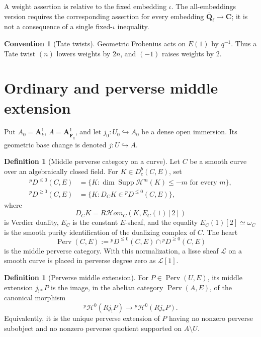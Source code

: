\documentclass[10pt]{article}
\theoremstyle{definition}
\newtheorem{definition}[theorem]{Definition}
\newtheorem{convention}[theorem]{Convention}
\newcommand{\Fbar}{\overline{\mathbf F}_q}
\newcommand{\Qlb}{\overline{\mathbf Q}_\ell}
\newcommand{\Aone}{\mathbf A^1}
\begin{document}
A weight assertion is relative to the fixed embedding \(\iota\).  The
all-embeddings version requires the corresponding assertion
for every embedding \(\Qlb\to\mathbf C\); it is not a consequence of
a single fixed-\(\iota\) inequality.

\begin{convention}[Tate twists]
Geometric Frobenius acts on \(E(1)\) by \(q^{-1}\).  Thus a Tate twist
\((n)\) lowers weights by \(2n\), and \((-1)\) raises weights by \(2\).
\end{convention}

\section{Ordinary and perverse middle extension}

Put \(A_0=\Aone_k\), \(A=\Aone_{\Fbar}\), and let
\(j_0:U_0\hookrightarrow A_0\) be a dense open immersion.  Its geometric
base change is denoted \(j:U\hookrightarrow A\).

\begin{definition}[Middle perverse category on a curve]
Let \(C\) be a smooth curve over an algebraically closed field.  For
\(K\in D^b_c(C,E)\), set
\[
 \begin{aligned}
 {}^pD^{\le0}(C,E)
   &=\{K:\dim\operatorname{Supp}\mathcal H^m(K)\le -m
          \text{ for every }m\},\\
 {}^pD^{\ge0}(C,E)
   &=\{K:D_CK\in{}^pD^{\le0}(C,E)\},
 \end{aligned}
\]
where
\[
 D_CK=R\mathcal Hom_C(K,E_C(1)[2])
\]
is Verdier duality, \(E_C\) is the constant \(E\)-sheaf, and the equality
\(E_C(1)[2]\simeq\omega_C\) is the smooth purity identification of the
dualizing complex of \(C\).  The heart
\[
  \operatorname{Perv}(C,E)
  :={}^pD^{\le0}(C,E)\cap{}^pD^{\ge0}(C,E)
\]
is the middle perverse category.  With this normalization, a lisse sheaf
\(\mathcal L\) on a smooth curve is placed in perverse degree zero as
\(\mathcal L[1]\).
\end{definition}

\begin{definition}[Perverse middle extension]
For \(P\in\operatorname{Perv}(U,E)\), its middle extension
\(j_{!*}P\) is the image, in the abelian category
\(\operatorname{Perv}(A,E)\), of the canonical morphism
\[
  {}^p\!\mathcal H^0(Rj_!P)\longrightarrow
  {}^p\!\mathcal H^0(Rj_*P).
\]
Equivalently, it is the unique perverse extension of \(P\) having no
nonzero perverse subobject and no nonzero perverse quotient supported on
\(A\setminus U\).
\end{definition}
\end{document}
